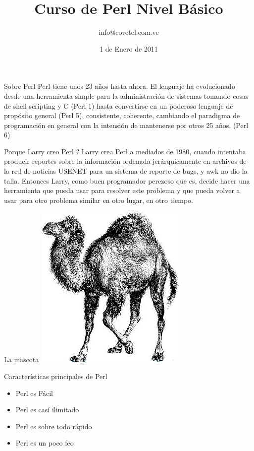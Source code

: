 \documentclass{beamer}
\title[Perl 01] {Curso de Perl Nivel Básico}
\author[Walter Vargas]{ info@covetel.com.ve \inst{1}}
\institute[covetel.com.ve]{ \inst{1} Cooperativa Venezolana de Tecnologías Libres R.S. }
\date[1 de Enero de 2011]{1 de Enero de 2011}
\begin{document}
\begin{frame}
  \titlepage
\end{frame}

\begin{frame}{Sobre Perl} %
Perl tiene unos 23 años hasta ahora. El lenguaje ha evolucionado desde una
herramienta simple para la administración de sistemas tomando cosas de shell
scripting y C (Perl 1) hasta convertirse en un poderoso lenguaje de propósito
general (Perl 5), consistente, coherente, cambiando el paradigma de
programación en general con la intensión de mantenerse por otros 25 años. (Perl
6) 
\end{frame}

\begin{frame}{Porque Larry creo Perl ?} %
Larry crea Perl a mediados de 1980,  cuando intentaba producir reportes sobre 
la información ordenada jerárquicamente en archivos de  la red de noticias 
USENET para un sistema de reporte de bugs,  y awk no dio la talla. Entonces
Larry, como buen programador perezoso que es,  decide hacer una herramienta que
pueda usar para resolver este problema y que pueda volver a usar para otro
problema similar en otro lugar,  en otro tiempo. 
\end{frame}

\begin{frame}{La mascota} %
\includegraphics[scale=1]{imgs/dromedario.jpg}
\end{frame}

\begin{frame}{Características principales de Perl} %
\begin{itemize}
    \item Perl es Fácil
    \item Perl es casí ilimitado
    \item Perl es sobre todo rápido 
    \item Perl es un poco feo  
\end{itemize}
\end{frame}
\end{document}
